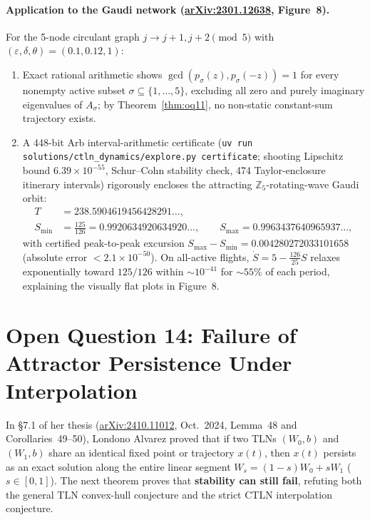 \documentclass[11pt]{article}
\theoremstyle{plain}
\theoremstyle{definition}
\theoremstyle{remark}
\begin{document}
\paragraph{Application to the Gaudi network (\href{https://arxiv.org/abs/2301.12638}{arXiv:2301.12638}, Figure~8).}
For the 5-node circulant graph $j \to j+1, j+2 \pmod 5$ with $(\varepsilon, \delta, \theta) = (0.1, 0.12, 1)$:
\begin{enumerate}[label=\textup{(\arabic*)}]
\item Exact rational arithmetic shows $\gcd(p_\sigma(z), p_\sigma(-z)) = 1$ for every nonempty active subset $\sigma \subseteq \{1,\dots,5\}$, excluding all zero and purely imaginary eigenvalues of $A_\sigma$; by Theorem~\ref{thm:oq11}, no non-static constant-sum trajectory exists.
\item A 448-bit Arb interval-arithmetic certificate (\texttt{uv run solutions/\allowbreak ctln\_dynamics/\allowbreak explore.py certificate}; shooting Lipschitz bound $6.39 \times 10^{-55}$, Schur--Cohn stability check, 474 Taylor-enclosure itinerary intervals) rigorously encloses the attracting $\mathbb{Z}_5$-rotating-wave Gaudi orbit:
\begin{align*}
T &= 238.5904619456428291\dots,\\
S_{\min} &= \frac{125}{126} = 0.9920634920634920\dots, \qquad
S_{\max} = 0.9963437640965937\dots,
\end{align*}
with certified peak-to-peak excursion $S_{\max} - S_{\min} = 0.004280272033101658$ (absolute error $< 2.1 \times 10^{-50}$). On all-active flights, $\dot{S} = 5 - \frac{126}{25} S$ relaxes exponentially toward $125/126$ within $\sim 10^{-41}$ for $\sim 55\%$ of each period, explaining the visually flat plots in Figure~8.
\end{enumerate}

\section{Open Question 14: Failure of Attractor Persistence Under Interpolation}

In \S7.1 of her thesis (\href{https://arxiv.org/abs/2410.11012}{arXiv:2410.11012}, Oct.\ 2024, Lemma~48 and Corollaries~49--50), Londono Alvarez proved that if two TLNs $(W_0, b)$ and $(W_1, b)$ share an identical fixed point or trajectory $x(t)$, then $x(t)$ persists as an exact solution along the entire linear segment $W_s = (1-s)W_0 + sW_1$ ($s \in [0, 1]$). The next theorem proves that \textbf{stability can still fail}, refuting both the general TLN convex-hull conjecture and the strict CTLN interpolation conjecture.
\end{document}
